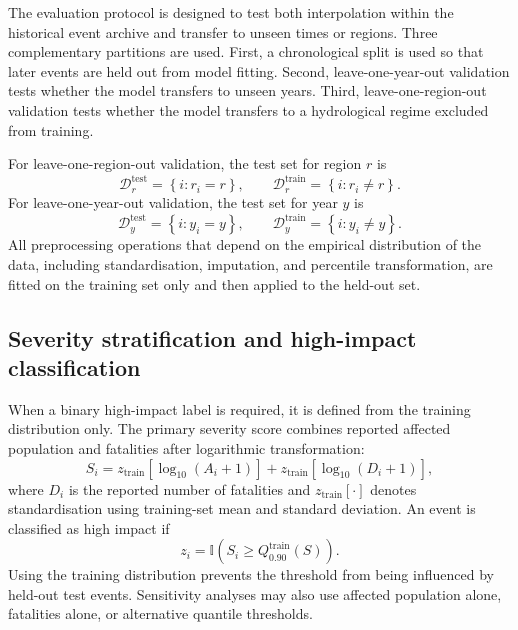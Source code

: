 \documentclass[pdflatex,sn-mathphys-ay]{sn-jnl}
\theoremstyle{thmstyleone}
\theoremstyle{thmstylethree}
\theoremstyle{thmstyletwo}
\begin{document}
\begin{appendices}
The evaluation protocol is designed to test both interpolation within
the historical event archive and transfer to unseen times or regions.
Three complementary partitions are used.  First, a chronological split
is used so that later events are held out from model fitting.  Second,
leave-one-year-out validation tests whether the model transfers to
unseen years.  Third, leave-one-region-out validation tests whether
the model transfers to a hydrological regime excluded from training.

For leave-one-region-out validation, the test set for region $r$ is
\begin{equation}
  \mathcal{D}^{\mathrm{test}}_{r}
  =
  \left\{
    i:r_i=r
  \right\},
  \qquad
  \mathcal{D}^{\mathrm{train}}_{r}
  =
  \left\{
    i:r_i\neq r
  \right\}.
  \label{eq:app_loro}
\end{equation}
For leave-one-year-out validation, the test set for year $y$ is
\begin{equation}
  \mathcal{D}^{\mathrm{test}}_{y}
  =
  \left\{
    i:y_i=y
  \right\},
  \qquad
  \mathcal{D}^{\mathrm{train}}_{y}
  =
  \left\{
    i:y_i\neq y
  \right\}.
  \label{eq:app_loyo}
\end{equation}
All preprocessing operations that depend on the empirical distribution
of the data, including standardisation, imputation, and percentile
transformation, are fitted on the training set only and then applied to
the held-out set.

\subsection{Severity stratification and high-impact classification}
\label{app:severity_stratification}

When a binary high-impact label is required, it is defined from the
training distribution only.  The primary severity score combines
reported affected population and fatalities after logarithmic
transformation:
\begin{equation}
  S_i
  =
  z_{\mathrm{train}}
  \left[
    \log_{10}
    \left(
      A_i+1
    \right)
  \right]
  +
  z_{\mathrm{train}}
  \left[
    \log_{10}
    \left(
      D_i+1
    \right)
  \right],
  \label{eq:app_severity_score}
\end{equation}
where $D_i$ is the reported number of fatalities and
$z_{\mathrm{train}}[\cdot]$ denotes standardisation using training-set
mean and standard deviation.  An event is classified as high impact if
\begin{equation}
  z_i
  =
  \mathbb{I}
  \left(
    S_i
    \geq
    Q_{0.90}^{\mathrm{train}}(S)
  \right).
  \label{eq:app_high_impact}
\end{equation}
Using the training distribution prevents the threshold from being
influenced by held-out test events.  Sensitivity analyses may also use
affected population alone, fatalities alone, or alternative quantile
thresholds.


\end{appendices}
\end{document}
